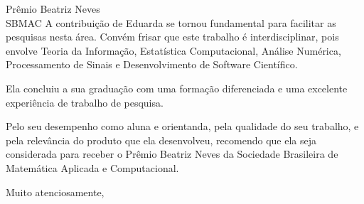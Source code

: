 \documentclass[12pt]{letter} %
\begin{document}
\begin{letter}{Prêmio Beatriz Neves\\
SBMAC}
A contribuição de Eduarda se tornou fundamental para facilitar as pesquisas nesta área.
Convém frisar que este trabalho é interdisciplinar, pois envolve Teoria da Informação, Estatística Computacional, Análise Numérica, Processamento de Sinais e Desenvolvimento de Software Científico.

Ela concluiu a sua graduação com uma formação diferenciada e uma excelente experiência de trabalho de pesquisa.

Pelo seu desempenho como aluna e orientanda,
pela qualidade do seu trabalho, e
pela relevância do produto que ela desenvolveu,
recomendo que ela seja considerada para receber o Prêmio Beatriz Neves da Sociedade Brasileira de Matemática Aplicada e Computacional.

\closing{Muito atenciosamente,} 
  

\end{letter}
\end{document}
